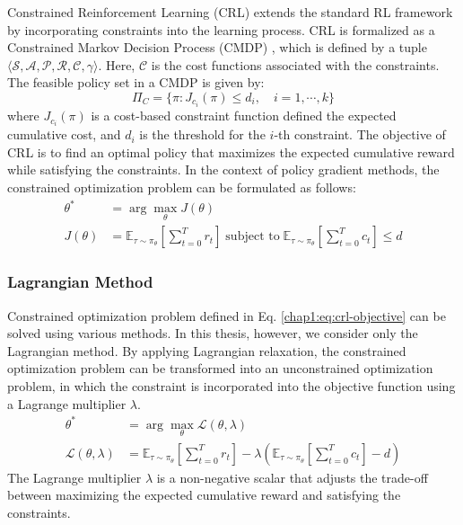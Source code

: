 Constrained Reinforcement Learning (CRL) extends the standard RL framework by incorporating constraints into the learning process.
CRL is formalized as a Constrained Markov Decision Process (CMDP) \cite{CMDP}, which is defined by a tuple $\langle \mathcal{S}, \mathcal{A}, \mathcal{P}, \mathcal{R}, \mathcal{C}, \gamma \rangle$.
Here, $\mathcal{C}$ is the cost functions associated with the constraints.
The feasible policy set in a CMDP is given by:
\begin{equation}
  \Pi_C = \{\pi: J_{c_i}(\pi) \leq d_i, \quad i = 1, \cdots, k\}
\end{equation}
where $J_{c_i}(\pi)$ is a cost-based constraint function defined the expected cumulative cost, and $d_i$ is the threshold for the $i$-th constraint.
The objective of CRL is to find an optimal policy that maximizes the expected cumulative reward while satisfying the constraints.
In the context of policy gradient methods, the constrained optimization problem can be formulated as follows:
\begin{equation} \label{chap1:eq:crl-objective}
  \begin{aligned}
    \theta^* &= \arg\max_\theta J(\theta) \\
    J(\theta) &= \mathbb{E}_{\tau \sim \pi_\theta} \left[ \sum^T_{t = 0} r_t \right] \; \text{subject to} \; \mathbb{E}_{\tau \sim \pi_\theta} \left[ \sum^T_{t = 0} c_t \right] \leq d
  \end{aligned}
\end{equation}

\subsubsection{Lagrangian Method}

Constrained optimization problem defined in Eq. \ref{chap1:eq:crl-objective} can be solved using various methods.
In this thesis, however, we consider only the Lagrangian method.
By applying Lagrangian relaxation, the constrained optimization problem can be transformed into an unconstrained optimization problem, in which the constraint is incorporated into the objective function using a Lagrange multiplier $\lambda$.
\begin{equation}
  \begin{aligned}
    \theta^* &= \arg\max_\theta \mathcal{L}(\theta, \lambda) \\
    \mathcal{L}(\theta, \lambda) &= \mathbb{E}_{\tau \sim \pi_\theta} \left[ \sum^T_{t = 0} r_t \right] - \lambda \left( \mathbb{E}_{\tau \sim \pi_\theta} \left[ \sum^T_{t = 0} c_t \right] - d \right)
  \end{aligned}
\end{equation}
The Lagrange multiplier $\lambda$ is a non-negative scalar that adjusts the trade-off between maximizing the expected cumulative reward and satisfying the constraints.


